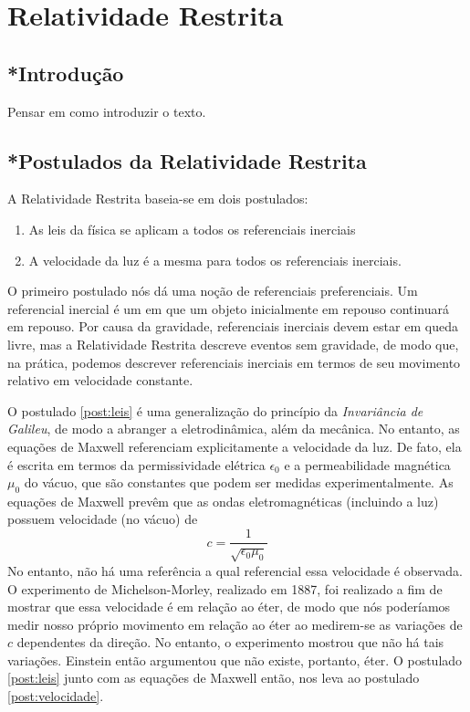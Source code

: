 \chapter{Relatividade Restrita}

\section{*Introdução}

{\color{red} Pensar em como introduzir o texto.}

\section{*Postulados da Relatividade Restrita}




A Relatividade Restrita baseia-se em dois postulados:

\begin{enumerate}[label=\textbf{(\Roman*)}]
    \item As leis da física se aplicam a todos os referenciais inerciais \label{post:leis}
    \item A velocidade da luz é a mesma para todos os referenciais inerciais. \label{post:velocidade}
\end{enumerate}

O primeiro postulado nós dá uma noção de referenciais preferenciais. Um referencial inercial é um em que um objeto inicialmente em repouso continuará em repouso. Por causa da gravidade, referenciais inerciais devem estar em queda livre, mas a Relatividade Restrita descreve eventos sem gravidade, de modo que, na prática, podemos descrever referenciais inerciais em termos de seu movimento relativo em velocidade constante.

O postulado \ref{post:leis} é uma generalização do princípio da \textit{Invariância de Galileu}, de modo a abranger a eletrodinâmica, além da mecânica. No entanto, as equações de Maxwell referenciam explicitamente a velocidade da luz. De fato, ela é escrita em termos da permissividade elétrica $\epsilon_0$ e a permeabilidade magnética $\mu_0$ do vácuo, que são constantes que podem ser medidas experimentalmente. As equações de Maxwell prevêm que as ondas eletromagnéticas (incluindo a luz) possuem velocidade (no vácuo) de 
\[
    c = \frac{1}{\sqrt{\epsilon_0\mu_0}}
\]
No entanto, não há uma referência a qual referencial essa velocidade é observada. O experimento de Michelson-Morley, realizado em 1887, foi realizado a fim de mostrar que essa velocidade é em relação ao éter, de modo que nós poderíamos medir nosso próprio movimento em relação ao éter ao medirem-se as variações de $c$ dependentes da direção. No entanto, o experimento mostrou que não há tais variações. Einstein então argumentou que não existe, portanto, éter. O postulado \ref{post:leis} junto com as equações de Maxwell então, nos leva ao postulado \ref{post:velocidade}.

